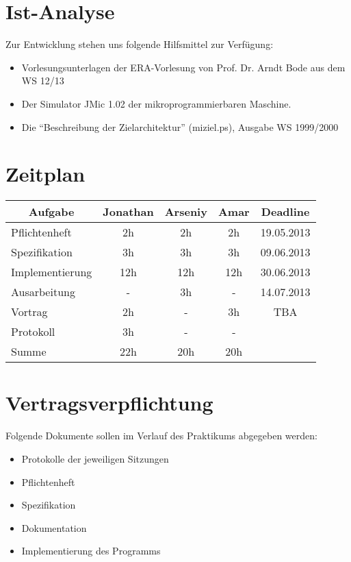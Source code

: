\documentclass[12pt,a4paper]{article}
\begin{document}
\section{Ist-Analyse}

Zur Entwicklung stehen uns folgende Hilfsmittel zur Verfügung:	
\begin{itemize}
\item Vorlesungsunterlagen der ERA-Vorlesung von Prof. Dr. Arndt Bode aus dem WS 12/13
\item Der Simulator JMic 1.02 der mikroprogrammierbaren Maschine.
\item Die “Beschreibung der Zielarchitektur” (miziel.ps), Ausgabe WS 1999/2000
\end{itemize}	

\section{Zeitplan}

\begin{center}
  \begin{tabular}{|*{5}{c|}}
    \hline
	Aufgabe & Jonathan & Arseniy & Amar & Deadline \\
    \hline
   	\multicolumn{1}{|l|}{Pflichtenheft} & 2h & 2h & 2h & 19.05.2013 \\
    \hline
    \multicolumn{1}{|l|}{Spezifikation} & 3h & 3h & 3h & 09.06.2013 \\
    \hline
    \multicolumn{1}{|l|}{Implementierung} & 12h & 12h & 12h & 30.06.2013 \\
    \hline
    \multicolumn{1}{|l|}{Ausarbeitung} & - & 3h & - & 14.07.2013 \\
    \hline
    \multicolumn{1}{|l|}{Vortrag} & 2h & - & 3h & TBA \\
    \hline
    \multicolumn{1}{|l|}{Protokoll} & 3h & - & - &  \\
    \hline
    \multicolumn{1}{|l|}{Summe} & 22h & 20h & 20h &  \\
    \hline
    
    
  \end{tabular}
\end{center}

\section{Vertragsverpflichtung}

Folgende Dokumente sollen im Verlauf des Praktikums abgegeben werden:
\begin{itemize}
\item Protokolle der jeweiligen Sitzungen
\item Pflichtenheft
\item Spezifikation
\item Dokumentation
\item Implementierung des Programms 
\end{itemize}
\end{document}
